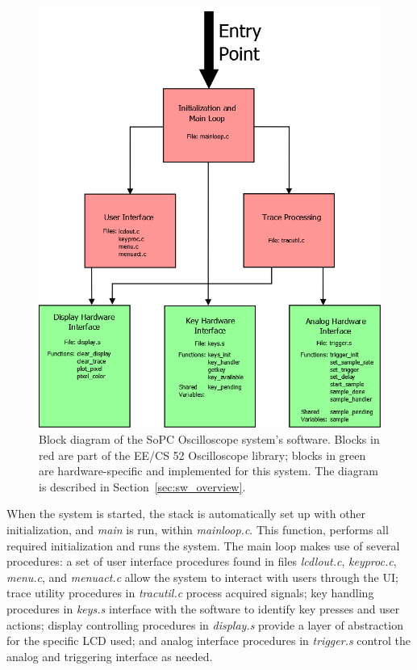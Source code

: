 \documentclass[titlepage]{scrartcl}
\begin{document}
	\begin{figure}[h!]
	\centerline{\includegraphics[width=\textwidth]{img/software_blocks.png}}
                	\caption{Block diagram of the SoPC Oscilloscope system's software. Blocks in red are part of the EE/CS 52 Oscilloscope library; blocks in green are hardware-specific and implemented for this system. The diagram is described in Section~\ref{sec:sw_overview}.}
               	\label{fig:software_blocks}
	\end{figure}

	When the system is started, the stack is automatically set up with other initialization, and \textit{main} is run, within \textit{mainloop.c}. This function, performs all required initialization and runs the system. The main loop makes use of several procedures: a set of user interface procedures found in files \textit{lcdlout.c}, \textit{keyproc.c}, \textit{menu.c}, and \textit{menuact.c} allow the system to interact with users through the UI; trace utility procedures in \textit{tracutil.c} process acquired signals; key handling procedures in \textit{keys.s} interface with the software to identify key presses and user actions; display controlling procedures in \textit{display.s} provide a layer of abstraction for the specific LCD used; and analog interface procedures in \textit{trigger.s} control the analog and triggering interface as needed.
\end{document}
